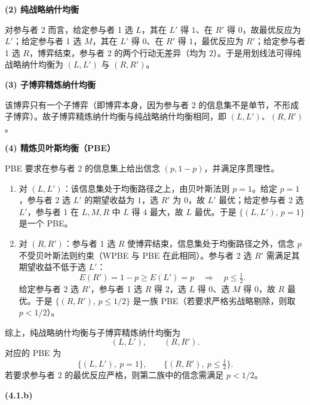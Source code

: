\noindent\textbf{(2) 纯战略纳什均衡}

对参与者 2 而言，给定参与者 1 选 $L$，其在 $L'$ 得 $1$、在 $R'$ 得 $0$，故最优反应为 $L'$；给定参与者 1 选 $M$，其在 $L'$ 得 $0$、在 $R'$ 得 $1$，最优反应为 $R'$；给定参与者 1 选 $R$，博弈结束，参与者 2 的两个行动无差异（均为 $2$）。于是用划线法可得纯战略纳什均衡为 $(L,L')$ 与 $(R,R')$。

\noindent\textbf{(3) 子博弈精炼纳什均衡}

该博弈只有一个子博弈（即博弈本身，因为参与者 2 的信息集不是单节，不形成子博弈）。故子博弈精炼纳什均衡与纯战略纳什均衡相同，即 $(L,L')$、$(R,R')$。

\noindent\textbf{(4) 精炼贝叶斯均衡（PBE）}

PBE 要求在参与者 2 的信息集上给出信念 $(p,1-p)$，并满足序贯理性。

\begin{enumerate}[leftmargin=1.6em]
  \item 对 $(L,L')$：该信息集处于均衡路径之上，由贝叶斯法则 $p=1$。给定 $p=1$，参与者 2 选 $L'$ 的期望收益为 $1$，选 $R'$ 为 $0$，故 $L'$ 最优；给定参与者 2 选 $L'$，参与者 1 在 $L,M,R$ 中 $L$ 得 $4$ 最大，故 $L$ 最优。于是 $\{(L,L'),\,p=1\}$ 是一个 PBE。
  \item 对 $(R,R')$：参与者 1 选 $R$ 使博弈结束，信息集处于均衡路径之外，信念 $p$ 不受贝叶斯法则约束（WPBE 与 PBE 在此相同）。参与者 2 选 $R'$ 需满足其期望收益不低于选 $L'$：
  \[
    E(R')=1-p \ge E(L')=p \quad\Longrightarrow\quad p\le \tfrac12 .
  \]\indent
  给定参与者 2 选 $R'$，参与者 1 选 $R$ 得 $2$，选 $L$ 得 $0$、选 $M$ 得 $0$，故 $R$ 最优。于是 $\{(R,R'),\,p\le 1/2\}$ 是一族 PBE（若要求严格劣战略剔除，则取 $p<1/2$）。
\end{enumerate}

综上，纯战略纳什均衡与子博弈精炼纳什均衡为
\[
  (L,L'),\qquad (R,R').
\]
\indent 对应的 PBE 为
\[
  \bigl\{(L,L'),\ p=1\bigr\},\qquad
  \bigl\{(R,R'),\ p\le \tfrac12\bigr\}.
\]
\indent 若要求参与者 2 的最优反应严格，则第二族中的信念需满足 $p<1/2$。

\vspace{0.6em}
\noindent\textbf{(4.1.b)}


